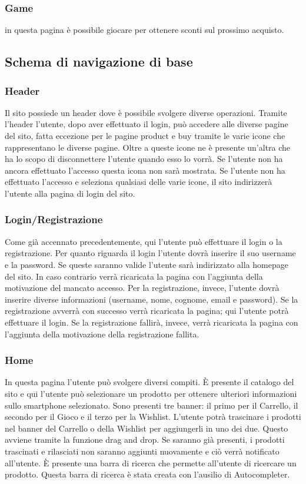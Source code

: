 \documentclass[12pt]{extarticle}
\begin{document}
\subsubsection{Game}
in questa pagina è possibile giocare per ottenere sconti sul prossimo acquisto. 


\subsection{Schema di navigazione di base}
\subsubsection{Header}
Il sito possiede un header dove è possibile svolgere diverse operazioni. Tramite l'header l'utente,
dopo aver effettuato il login, può accedere alle diverse pagine del sito, fatta eccezione per le
pagine product e buy tramite le varie icone che rappresentano le diverse pagine. Oltre a queste
icone ne è presente un'altra che ha lo scopo di disconnettere l'utente quando esso lo vorrà. Se
l'utente non ha ancora effettuato l'accesso questa icona non sarà mostrata. Se l'utente non ha
effettuato l'accesso e seleziona qualsiasi delle varie icone, il sito indirizzerà l'utente alla pagina di
login del sito.


\subsubsection{Login/Registrazione}
Come già accennato precedentemente, qui l'utente può effettuare il login o la registrazione.
Per quanto riguarda il login l'utente dovrà inserire il suo username e la password. Se queste
saranno valide l'utente sarà indirizzato alla homepage del sito. In caso contrario verrà ricaricata la
pagina con l'aggiunta della motivazione del mancato accesso.
Per la registrazione, invece, l'utente dovrà inserire diverse informazioni (username, nome,
cognome, email e password). Se la registrazione avverrà con successo verrà ricaricata la pagina;
qui l'utente potrà effettuare il login. Se la registrazione fallirà, invece, verrà ricaricata la pagina con
l'aggiunta della motivazione della registrazione fallita.

\subsubsection{Home}
In questa pagina l'utente può svolgere diversi compiti.
È presente il catalogo del sito e qui l'utente può selezionare un prodotto per ottenere ulteriori
informazioni sullo smartphone selezionato.
Sono presenti tre banner: il primo per il Carrello, il secondo per il Gioco e il terzo per la Wishlist.
L'utente potrà trascinare i prodotti nel banner del Carrello o della Wishlist per aggiungerli in uno
dei due. Questo avviene tramite la funzione drag and drop. Se saranno già presenti, i prodotti
trascinati e rilasciati non saranno aggiunti nuovamente e ciò verrà notificato all'utente.
È presente una barra di ricerca che permette all'utente di ricercare un prodotto. Questa barra di
ricerca è stata creata con l'ausilio di Autocompleter.
\end{document}
